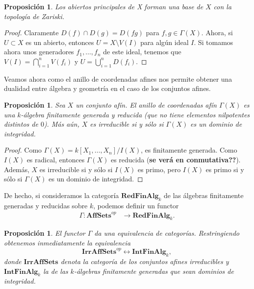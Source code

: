 \documentclass[12pt,a4paper]{article}
\newtheorem{prop}[thm]{Proposición}
\theoremstyle{definition} \newtheorem{defn}[thm]{Definición}
\theoremstyle{definition} \newtheorem{ejemplo}[thm]{Ejemplo}
\theoremstyle{definition} \newtheorem{ejercicio}[thm]{Ejercicio}
\theoremstyle{remark} \newtheorem*{obs}{Observación}
\begin{document}
    \begin{prop}
      Los abiertos principales de X forman una base de $X$ con la topología de Zariski.
    \end{prop}
    \begin{proof}
      Claramente $D(f)\cap D(g)=D(fg)$ para $f,g \in \Gamma(X)$. Ahora, si $U\subset X$ es un abierto, entonces $U=X\setminus V(I)$ para algún ideal $I$. Si tomamos ahora unos generadores $f_1,\dots,f_n$ de este ideal, tenemos que $V(I)=\bigcap_{i=1}^n V(f_i)$ y $U=\bigcup_{i=1}^n D(f_i)$.
    \end{proof}
    
    Veamos ahora como el anillo de coordenadas afines nos permite obtener una dualidad entre álgebra y geometría en el caso de los conjuntos afines. 
    \begin{prop}
      Sea $X$ un conjunto afín. El anillo de coordenadas afín $\Gamma(X)$ es una $k$-álgebra finitamente generada y reducida (que no tiene elementos nilpotentes distintos de $0$). Más aún, $X$ es irreducible si y sólo si $\Gamma(X)$ es un dominio de integridad.
    \end{prop}
    \begin{proof}
      Como $\Gamma(X)=k[X_1,\dots,X_n]/I(X)$, es finitamente generada. Como $I(X)$ es radical, entonces $\Gamma(X)$ es reducida (\textbf{se verá en conmutativa??}). Además, $X$ es irreducible si y sólo si $I(X)$ es primo, pero $I(X)$ es primo si y sólo si $\Gamma(X)$ es un dominio de integridad.
    \end{proof}

    De hecho, si consideramos la categoría $\mathbf{RedFinAlg}_k$ de las álgebras finitamente generadas y reducidas sobre $k$, podemos definir un functor
    \begin{align*}
      \Gamma : \mathbf{AffSets}^{op}&\longrightarrow \mathbf{RedFinAlg}_k.
      \end{align*}

      \begin{prop}
	El functor $\Gamma$ da una equivalencia de categorías. Restringiendo obtenemos inmediatamente la equivalencia
	\begin{equation*}
	  \mathbf{IrrAffSets}^{op} \longleftrightarrow \mathbf{IntFinAlg}_k,
	\end{equation*}
	donde $\mathbf{IrrAffSets}$ denota la categoría de los conjuntos afines irreducibles y $\mathbf{IntFinAlg}_k$ la de las $k$-álgebras finitamente generadas que sean dominios de integridad.
      \end{prop}
\end{document}
